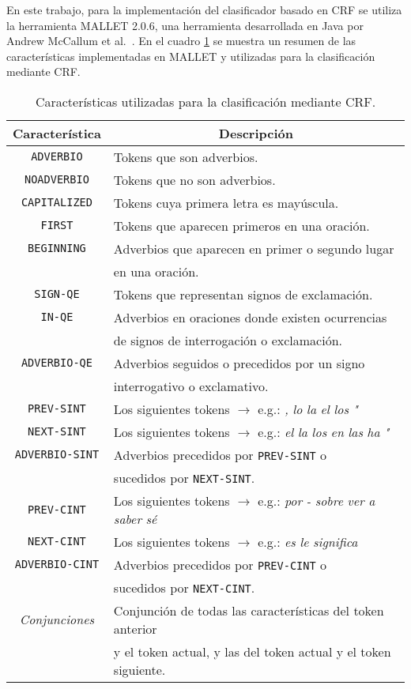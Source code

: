 \documentclass[runningheads,a4paper]{llncs}
\begin{document}
En este trabajo, para la implementación del clasificador basado en CRF se utiliza la herramienta MALLET 2.0.6, una herramienta desarrollada en Java por Andrew McCallum et al.~\cite{MCCALLUM02}. En el cuadro \ref{table:featuresCRF} se muestra un resumen de las características implementadas en MALLET y utilizadas para la clasificación mediante CRF.

\begin{table}[ht]
 	\renewcommand{\arraystretch}{1.3}
	\renewcommand{\tabcolsep}{3pt}
	\caption{Características utilizadas para la clasificación mediante CRF.}
	\label{table:featuresCRF}
	\centering
	\begin{tabular}{c l}
		\hline\hline
		\multicolumn{1}{c}{\textbf{Característica}} & \multicolumn{1}{c}{\textbf{Descripción}} \\
		\hline
		\texttt{ADVERBIO} & Tokens que son adverbios. \\
		\texttt{NOADVERBIO} & Tokens que no son adverbios. \\
		\texttt{CAPITALIZED} & Tokens cuya primera letra es mayúscula. \\
		\texttt{FIRST} & Tokens que aparecen primeros en una oración. \\
		\texttt{BEGINNING} & Adverbios que aparecen en primer o segundo lugar \\
		& en una oración. \\
		\texttt{SIGN-QE} & Tokens que representan signos de exclamación. \\
		\texttt{IN-QE} & Adverbios en oraciones donde existen ocurrencias \\
		& de signos de interrogación o exclamación. \\
		\texttt{ADVERBIO-QE} & Adverbios seguidos o precedidos por un signo \\
		& interrogativo o exclamativo. \\
		\texttt{PREV-SINT} & Los siguientes tokens $\rightarrow$ e.g.: \emph{,} \emph{lo} \emph{la} \emph{el} \emph{los} \emph{"} \\
		\texttt{NEXT-SINT} & Los siguientes tokens $\rightarrow$ e.g.: \emph{el} \emph{la} \emph{los} \emph{en} \emph{las} \emph{ha} \emph{"} \\
		\texttt{ADVERBIO-SINT} & Adverbios precedidos por \texttt{PREV-SINT} o \\
		& sucedidos por \texttt{NEXT-SINT}. \\
		\texttt{PREV-CINT} & Los siguientes tokens $\rightarrow$ e.g.: \emph{por} \emph{-} \emph{sobre} \emph{ver} \emph{a} \emph{saber} \emph{sé} \\
		\texttt{NEXT-CINT} & Los siguientes tokens $\rightarrow$ e.g.: \emph{es} \emph{le} \emph{significa} \\
		\texttt{ADVERBIO-CINT} & Adverbios precedidos por \texttt{PREV-CINT} o \\
		& sucedidos por \texttt{NEXT-CINT}. \\
		\emph{Conjunciones} & Conjunción de todas las características del token anterior \\
		& y el token actual, y las del token actual y el token siguiente. \\
		\hline
	\end{tabular}
\end{table}
\end{document}
